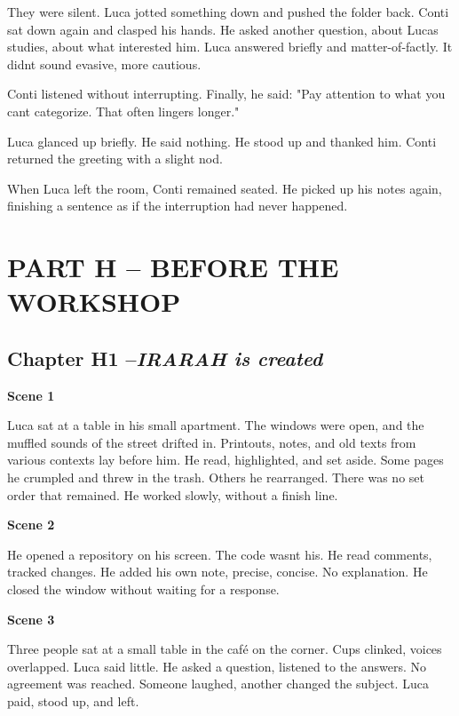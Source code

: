 \documentclass[
]{article}
\begin{document}
They were silent. Luca jotted something down and pushed the folder back. Conti sat down again and clasped his hands. He asked another question, about Luca\textquotesingle s studies, about what interested him. Luca answered briefly and matter-of-factly. It didn\textquotesingle t sound evasive, more cautious.

Conti listened without interrupting. Finally, he said: "Pay attention to what you can\textquotesingle t categorize. That often lingers longer."

Luca glanced up briefly. He said nothing. He stood up and thanked him. Conti returned the greeting with a slight nod.

When Luca left the room, Conti remained seated. He picked up his notes again, finishing a sentence as if the interruption had never happened.

\section{PART H -- BEFORE THE WORKSHOP}\label{part-h-before-the-workshop}

\subsection{\texorpdfstring{Chapter H1 --\emph{IRARAH is created}}{Chapter H1 --IRARAH is created}}\label{chapter-h1-irarah-is-created}

\textbf{Scene 1}

Luca sat at a table in his small apartment. The windows were open, and the muffled sounds of the street drifted in. Printouts, notes, and old texts from various contexts lay before him. He read, highlighted, and set aside. Some pages he crumpled and threw in the trash. Others he rearranged. There was no set order that remained. He worked slowly, without a finish line.

\textbf{Scene 2}

He opened a repository on his screen. The code wasn\textquotesingle t his. He read comments, tracked changes. He added his own note, precise, concise. No explanation. He closed the window without waiting for a response.

\textbf{Scene 3}

Three people sat at a small table in the café on the corner. Cups clinked, voices overlapped. Luca said little. He asked a question, listened to the answers. No agreement was reached. Someone laughed, another changed the subject. Luca paid, stood up, and left.
\end{document}

